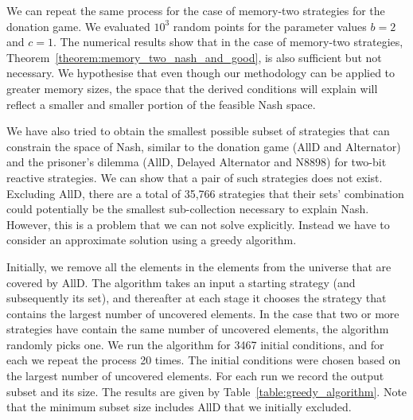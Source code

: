 \documentclass{article}
\theoremstyle{definition}
\begin{document}
We can repeat the same process for the case of memory-two strategies for the
donation game. We evaluated \(10^3\) random points for the parameter values \(b=2\)
and \(c=1\). The numerical results show that in the case of memory-two strategies,
Theorem~\ref{theorem:memory_two_nash_and_good}, is also sufficient but not
necessary. We hypothesise that even though our methodology can be applied to
greater memory sizes, the space that the derived conditions will explain will
reflect a smaller and smaller portion of the feasible Nash space.

We have also tried to obtain the smallest possible subset of strategies that can
constrain the space of Nash, similar to the donation game (AllD and Alternator)
and the prisoner's dilemma (AllD, Delayed Alternator and N8898) for two-bit
reactive strategies. We can show that a pair of such strategies does not exist.
Excluding AllD, there are a total of 35,766 strategies that their sets'
combination could potentially  be the smallest sub-collection necessary to
explain Nash. However, this is a problem that we can not solve explicitly.
Instead we have to consider an approximate solution using a greedy algorithm.

Initially, we remove all the elements in the elements from the universe that are
covered by AllD. The algorithm takes an input a starting strategy (and
subsequently its set), and thereafter at each stage it chooses the strategy that
contains the largest number of uncovered elements. In the case that two or more
strategies have contain the same number of uncovered elements, the algorithm
randomly picks one. We run the algorithm for 3467 initial conditions, and for
each we repeat the process 20 times. The initial conditions were chosen based on
the largest number of uncovered elements. For each run we record the output
subset and its size. The results are given by
Table~\ref{table:greedy_algorithm}. Note that the minimum subset size includes
AllD that we initially excluded.

\begin{table}[htbp]
  \centering
\caption{\textbf{Results of greedy algorithm.} The greedy algorithm was used to
find the smallest possible subset of pure memory-two strategies that can
constrain the space of Nash in the case of memory-two strategies. Based on the
approximate solution, the smallest subset is of size
11.}\label{table:greedy_algorithm}
\end{table}
\end{document}
